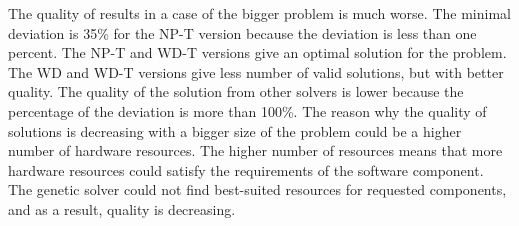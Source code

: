 The quality of results in a case of the bigger problem is much worse. The minimal deviation is 35\% for the NP-T version because the deviation is less than one percent. The NP-T and WD-T versions give an optimal solution for the problem. The WD and WD-T versions give less number of valid solutions, but with better quality. The quality of the solution from other solvers is lower because the percentage of the deviation is more than 100\%. The reason why the quality of solutions is decreasing with a bigger size of the problem could be a higher number of hardware resources. The higher number of resources means that more hardware resources could satisfy the requirements of the software component. The genetic solver could not find best-suited resources for requested components, and as a result, quality is decreasing. 


